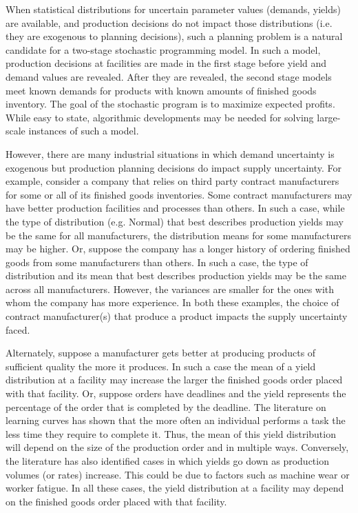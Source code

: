 \documentclass[12pt]{article}
\theoremstyle{thmstylethree}%
\begin{document}
When statistical distributions for uncertain parameter values (demands, yields) are available, and production decisions do not impact those distributions (i.e. they are exogenous to planning decisions), such a planning problem is a natural candidate for a two-stage stochastic programming model. In such a model, production decisions at facilities are made in the first stage before yield and demand values are revealed. After they are revealed, the second stage models meet known demands for products with known amounts of finished goods inventory. The goal of the stochastic program is to maximize expected profits. While easy to state, algorithmic developments may be needed for solving large-scale instances of such a model. 

However, there are many industrial situations in which demand uncertainty is exogenous but production planning decisions do impact supply uncertainty. For example, consider a company that relies on third party contract manufacturers for some or all of its finished goods inventories. Some contract manufacturers may have better production facilities and processes than others. In such a case, while the type of distribution (e.g. Normal) that best describes production yields may be the same for all manufacturers, the distribution means for some manufacturers may be higher. Or, suppose the company has a longer history of ordering finished goods from some manufacturers than others. In such a case, the type of distribution and its mean that best describes production yields  may be the same across all manufacturers. However, the variances are smaller for the ones with whom the company has more experience. In both these examples, the choice of contract manufacturer(s) that produce a product impacts the supply uncertainty faced.  

Alternately, suppose a manufacturer gets better at producing products of sufficient quality the more it produces. In such a case the mean of a yield distribution at a facility may increase the larger the finished goods order placed with that facility.  Or, suppose orders have deadlines and the yield represents the percentage of the order that is completed by the deadline. The literature on learning curves \cite{ANZANELLO2011573} has shown that the more often an individual performs a task the less time they require to complete it. Thus, the mean of this yield distribution will depend on the size of the production order and in multiple ways. Conversely, the literature \cite{Moutaz1994,SANA2010158} has also identified cases in which yields go down as production volumes (or rates) increase. This could be due to factors such as machine wear or worker fatigue. In all these cases, the yield distribution at a facility may depend on the finished goods order placed with that facility.
\end{document}
